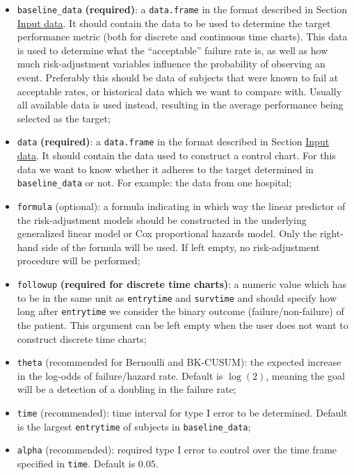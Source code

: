\begin{itemize}
\tightlist
\item
  \texttt{baseline\_data} \textbf{(required)}: a \texttt{data.frame} in the format described in Section \protect\hyperlink{input-data}{Input data}. It should contain the data to be used to determine the target performance metric (both for discrete and continuous time charts). This data is used to determine what the ``acceptable'' failure rate is, as well as how much risk-adjustment variables influence the probability of observing an event. Preferably this should be data of subjects that were known to fail at acceptable rates, or historical data which we want to compare with. Usually all available data is used instead, resulting in the average performance being selected as the target;
\item
  \texttt{data} \textbf{(required)}: a \texttt{data.frame} in the format described in Section \protect\hyperlink{input-data}{Input data}. It should contain the data used to construct a control chart. For this data we want to know whether it adheres to the target determined in \texttt{baseline\_data} or not. For example: the data from one hospital;
\item
  \texttt{formula} (optional): a formula indicating in which way the linear predictor of the risk-adjustment models should be constructed in the underlying generalized linear model or Cox proportional hazards model. Only the right-hand side of the formula will be used. If left empty, no risk-adjustment procedure will be performed;
\item
  \texttt{followup} \textbf{(required for discrete time charts)}: a numeric value which has to be in the same unit as \texttt{entrytime} and \texttt{survtime} and should specify how long after \texttt{entrytime} we consider the binary outcome (failure/non-failure) of the patient. This argument can be left empty when the user does not want to construct discrete time charts;
\item
  \texttt{theta} (recommended for Bernoulli and BK-CUSUM): the expected increase in the log-odds of failure/hazard rate. Default is \(\log(2)\), meaning the goal will be a detection of a doubling in the failure rate;
\item
  \texttt{time} (recommended): time interval for type I error to be determined. Default is the largest \texttt{entrytime} of subjects in \texttt{baseline\_data};
\item
  \texttt{alpha} (recommended): required type I error to control over the time frame specified in \texttt{time}. Default is \(0.05\).
\end{itemize}

